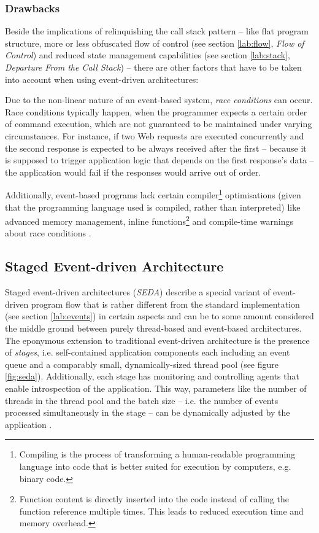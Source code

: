 \subsubsection*{Drawbacks}
Beside the implications of relinquishing the call stack pattern -- like flat program structure, more or less obfuscated flow of control (see section \ref{lab:flow}, \textit{Flow of Control}) and reduced state management capabilities (see section \ref{lab:stack}, \textit{Departure From the Call Stack}) -- there are other factors that have to be taken into account when using event-driven architectures: 

Due to the non-linear nature of an event-based system, \textit{race conditions} can occur. Race conditions typically happen, when the programmer expects a certain order of command execution, which are not guaranteed to be maintained under varying circumstances. For instance, if two Web requests are executed concurrently and the second response is expected to be always received after the first -- because it is supposed to trigger application logic that depends on the first response's data -- the application would fail if the responses would arrive out of order.

Additionally, event-based programs lack certain compiler\footnote{Compiling is the process of transforming a human-readable programming language into code that is better suited for execution by computers, e.g. binary code.} optimisations (given that the programming language used is compiled, rather than interpreted) like advanced memory management, inline functions\footnote{Function content is directly inserted into the code instead of calling the function reference multiple times. This leads to reduced execution time and memory overhead.} and compile-time warnings about race conditions \cite[p. 5]{Behren2003}.


\subsection{Staged Event-driven Architecture}
\label{sec:seda}
Staged event-driven architectures (\textit{SEDA}) describe a special variant of event-driven program flow that is rather different from the standard implementation (see section \ref{lab:events}) in certain aspects and can be to some amount considered the middle ground between purely thread-based and event-based architectures. The eponymous extension to traditional event-driven architecture is the presence of \textit{stages}, i.e. self-contained application components each including an event queue and a comparably small, dynamically-sized thread pool (see figure \ref{fig:seda}). Additionally, each stage has monitoring and controlling agents that enable introspection of the application. This way, parameters like the number of threads in the thread pool and the batch size -- i.e. the number of events processed simultaneously in the stage -- can be dynamically adjusted by the application \cite{Welsh2001}. 

